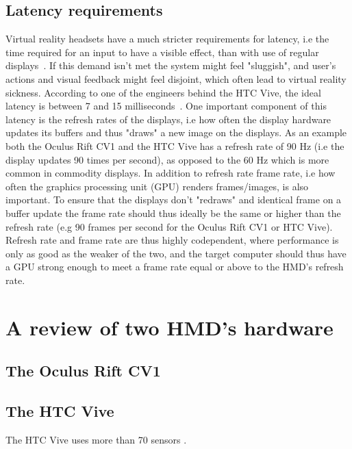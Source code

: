 \subsection{Latency requirements}
Virtual reality headsets have a much stricter requirements for latency, i.e the time required for an input to have a visible effect, 
than with use of regular displays~\citep{ROADTOVR2013}. If this demand isn't met the system might feel "sluggish", and user's actions and 
visual feedback might feel disjoint, which often lead to virtual reality sickness. According to one of the engineers behind the HTC Vive, the ideal
latency is between 7 and 15 milliseconds~\citep{ARSTECHNICA2013}. One important component of this latency is the refresh rates of the displays, i.e 
how often the display hardware updates its buffers and thus "draws" a new image on the displays. As an example both the Oculus Rift CV1 and the HTC Vive
has a refresh rate of 90 Hz (i.e the display updates 90 times per second), as opposed to the 60 Hz which is more common in commodity displays.
In addition to refresh rate frame rate, i.e how often the graphics processing unit (GPU) renders frames/images, is also important. To ensure 
that the displays don't "redraws" and identical frame on a buffer update the frame rate should thus ideally be the same or higher than the refresh 
rate (e.g 90 frames per second for the Oculus Rift CV1 or HTC Vive). Refresh rate and frame rate are thus highly codependent, where performance is only as good as the weaker
of the two, and the target computer should thus have a GPU strong enough to meet a frame rate equal or above to the HMD's refresh rate. 



\section{A review of two HMD's hardware}

\subsection{The Oculus Rift CV1}

\subsection{The HTC Vive}
The HTC Vive uses more than 70 sensors \citep{BBC2015}.